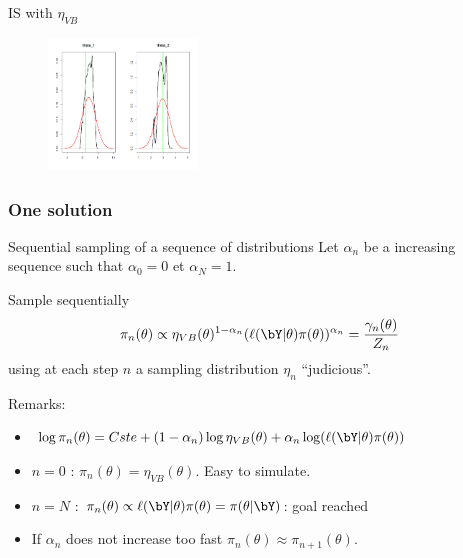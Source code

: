 \begin{frame}{IS with $\eta_{VB}$}
\begin{figure}
\begin{minipage}[c]{.46\linewidth}
   \end{minipage}
   \includegraphics[width=\textwidth,height=3.5cm]{figures/post_IS_vraie_VBEM.png}
\end{figure}
\end{frame}



\begin{frame}\frametitle{One solution}


\begin{block}{Sequential sampling of a sequence of distributions} 
Let $\alpha_n$ be a increasing sequence such that
$\alpha_0 = 0  $ et $\alpha_N=1 $. 

Sample sequentially 
$$\pi_n(\theta)  \propto   \eta_{VB}(\theta)^{1- \alpha_n} (\ell(\bY | \theta) \pi(\theta))^{\alpha_n} = \frac{\gamma_n(\theta)}{Z_n}$$ 
using at each step  $n$  a sampling distribution  $\eta_n$ ``judicious''. 
\end{block}

\vert Remarks: \noir
\begin{itemize}
\item $\log\pi_n(\theta) = Cste +   (1- \alpha_n)  \log \eta_{VB}(\theta) + \alpha_n  \log (\ell(\bY | \theta) \pi(\theta))$
\item $n=0$ : $\pi_n(\theta)   =   \eta_{VB}(\theta)$.  Easy to simulate.  
\item $n=N$ : $ \pi_n(\theta)   \propto   \ell(\bY | \theta) \pi(\theta) = \pi(\theta| \bY)$: \vert goal reached
\item If $\alpha_n$ does not increase too fast $\pi_n(\theta) \approx \pi_{n+1}(\theta)$. 
 \end{itemize}
\end{frame}




